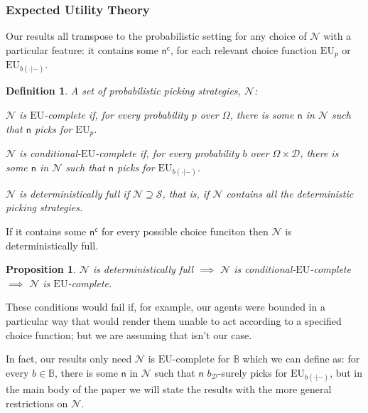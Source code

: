 \documentclass[a4paper]{article}
\newtheorem{definition}{Definition}
\newtheorem{proposition}[theorem]{Proposition}
\newcommand\EU{\mathrm{EU}}
\newcommand{\Decs}{\mathcal{D}}
\renewcommand\S{\mathcal{S}}
\renewcommand\c{\mathsf{c}} %
\newcommand{\n}{\mathsf{n}}
\renewcommand{\nu}{\n}
\newcommand\Nu{\mathcal{N}}
\newcommand{\IB}{\mathbb{B}}
\renewcommand{\color}[1]{}
\newenvironment{colored}[1]{\leavevmode\color{#1}}{}
\newenvironment{CCM rewritten}
{\begingroup\color{blue}} %
{\endgroup}              %
\begin{document}
\subsubsection{Expected Utility Theory}

Our results all transpose to the probabilistic setting for any choice of $\Nu$ with a particular feature: it contains some $\nu^\c$, for each relevant choice function $\EU_p$ or $\EU_{b(\cdot|-)}$.
\begin{definition}\label{def:EU-complete}
	A set of probabilistic picking strategies, $\Nu$:
	
	$\Nu$ is \emph{$\EU$-complete} if, for every probability $p$ over $\Omega$, there is some $\n$ in $\Nu$ such that $\n$ picks for $\EU_p$.
	
	$\Nu$ is \emph{conditional-$\EU$-complete} if, for every probability $b$ over $\Omega\times\Decs$, there is some $\n$ in $\Nu$ such that $\n$ picks for $\EU_{b(\cdot|-)}$.

		
	$\Nu$ is \emph{deterministically full} if $\Nu\supseteq\S$, that is, if $\Nu$  contains all the deterministic picking strategies. 

		

\end{definition}
If it contains some $\nu^\c$ for every possible choice funciton then $\Nu$ is deterministically full. 
\begin{proposition}
 $\Nu$ is deterministically full
		$\implies$  $\Nu$ is  conditional-$\EU$-complete 
		$\implies$  $\Nu$ is  $\EU$-complete.
\end{proposition}

These conditions would fail if, for example, our agents were bounded in a particular way that would render them unable to act according to a specified choice function; but we are assuming that isn't our case. 

In fact, our results only need 	$\Nu$ is {$\EU$-complete for $\IB$} which we can define as: for every  $b\in \IB$, there is some $\n$ in $\Nu$ such that $\n$ $b_\Decs$-surely picks for $\EU_{b(\cdot|-)}$,  but in the main body of the paper we will state the results with the more general restrictions on $\Nu$.
	
\end{document}
